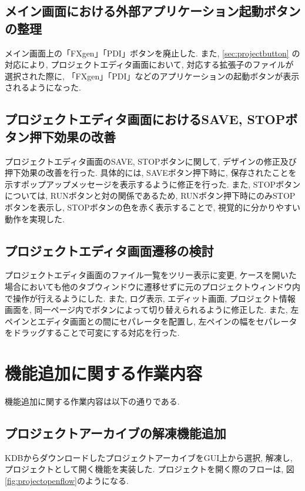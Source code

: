 \documentclass[a4paper,10pt,oneside]{jsbook}
\begin{document}
\section{メイン画面における外部アプリケーション起動ボタンの整理}
メイン画面上の「FXgen」「PDI」ボタンを廃止した. また, \ref{sec:projectbutton} の対応により, プロジェクトエディタ画面において, 対応する拡張子のファイルが選択された際に, 「FXgen」「PDI」などのアプリケーションの起動ボタンが表示されるようになった.

\section{プロジェクトエディタ画面におけるSAVE, STOPボタン押下効果の改善}
プロジェクトエディタ画面のSAVE, STOPボタンに関して, デザインの修正及び押下効果の改善を行った. 
具体的には, SAVEボタン押下時に, 保存されたことを示すポップアップメッセージを表示するように修正を行った.
また, STOPボタンについては, RUNボタンと対の関係であるため, RUNボタン押下時にのみSTOPボタンを表示し, STOPボタンの色を赤く表示することで, 視覚的に分かりやすい動作を実現した.

\section{プロジェクトエディタ画面遷移の検討}
プロジェクトエディタ画面のファイル一覧をツリー表示に変更, ケースを開いた場合においても他のタブウィンドウに遷移せずに元のプロジェクトウィンドウ内で操作が行えるようにした. また, ログ表示, エディット画面, プロジェクト情報画面を, 同一ページ内でボタンによって切り替えられるように修正した. また, 左ペインとエディタ画面との間にセパレータを配置し, 左ペインの幅をセパレータをドラッグすることで可変にする対応を行った.

\chapter{機能追加に関する作業内容}
機能追加に関する作業内容は以下の通りである.

\section{プロジェクトアーカイブの解凍機能追加}
KDBからダウンロードしたプロジェクトアーカイブをGUI上から選択, 解凍し, プロジェクトとして開く機能を実装した. プロジェクトを開く際のフローは, 図\ref{fig:projectopenflow}のようになる.
\end{document}
